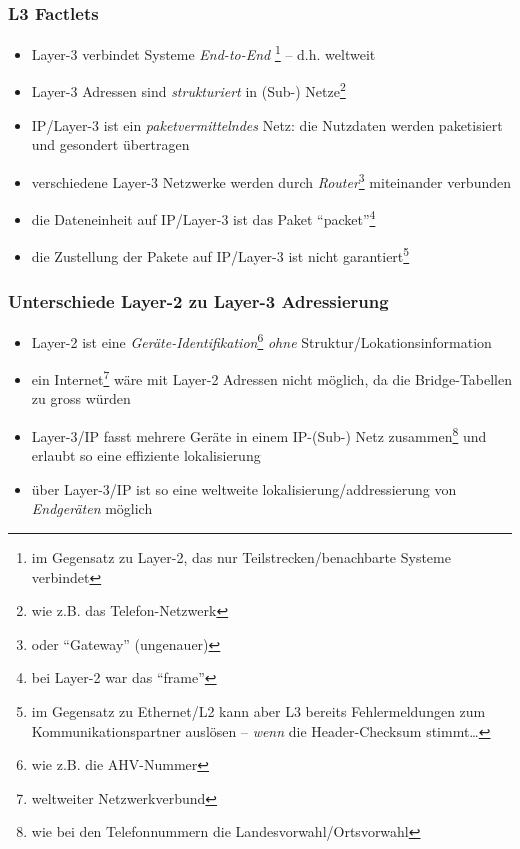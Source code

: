 \documentclass{beamer}
\begin{document}
\begin{frame}
\frametitle{L3 Factlets}
\begin{itemize}
	\item{Layer-3 verbindet Systeme {\em End-to-End} \footnote{im Gegensatz zu Layer-2, das nur Teilstrecken/benachbarte Systeme verbindet} -- d.h. weltweit}
	\item{Layer-3 Adressen sind {\em strukturiert} in (Sub-) Netze\footnote{wie z.B. das Telefon-Netzwerk}}
	\item{IP/Layer-3 ist ein {\em paketvermittelndes} Netz: die Nutzdaten werden paketisiert und gesondert \"ubertragen}
	\item{verschiedene Layer-3 Netzwerke werden durch {\em Router}\footnote{oder ``Gateway'' (ungenauer)} miteinander verbunden}
	\item{die Dateneinheit auf IP/Layer-3 ist das Paket ``packet''\footnote{bei Layer-2 war das ``frame''}}
	\item{die Zustellung der Pakete auf IP/Layer-3 ist nicht garantiert\footnote{im Gegensatz zu Ethernet/L2 kann aber L3 bereits Fehlermeldungen zum Kommunikationspartner ausl\"osen -- \emph{wenn} die Header-Checksum stimmt\ldots}}
\end{itemize}
\end{frame}

\begin{frame}
\frametitle{Unterschiede Layer-2 zu Layer-3 Adressierung}
\begin{itemize}
	\item{Layer-2 ist eine {\em Ger\"ate-Identifikation}\footnote{wie z.B. die AHV-Nummer} {\em ohne} Struktur/Lokationsinformation}
	\item{ein Internet\footnote{weltweiter Netzwerkverbund} w\"are mit Layer-2 Adressen nicht m\"oglich, da die Bridge-Tabellen zu gross w\"urden}
	\item{Layer-3/IP fasst mehrere Ger\"ate in einem IP-(Sub-) Netz zusammen\footnote{wie bei den Telefonnummern die Landesvorwahl/Ortsvorwahl} und erlaubt so eine effiziente lokalisierung}
	\item{\"uber Layer-3/IP ist so eine weltweite lokalisierung/addressierung von {\em Endger\"aten} m\"oglich}
\end{itemize}
\end{frame}
\end{document}
